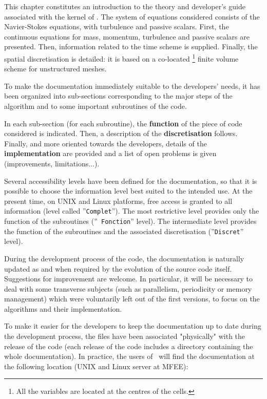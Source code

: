 This chapter constitutes an introduction to the theory and developer's guide
associated with the kernel of \CS.
The system of equations considered consists of the
Navier-Stokes equations, with turbulence and passive scalars. First, the
continuous equations for mass, momentum, turbulence and passive scalars are
presented. Then, information related to the time scheme is supplied.
Finally, the spatial discretisation is detailed: it is based on a co-located%
\footnote{%
All the variables are located at the centres of the cells.} finite volume
scheme for unstructured meshes.

To make the documentation immediately suitable to the developers' needs, it
has been organized into sub-sections corresponding to the major steps of the
algorithm and to some important subroutines of the code.

In each sub-section (for each subroutine), the \textbf{function} of the
piece of code considered is indicated. Then, a description of the \textbf{%
discretisation} follows. Finally, and more oriented towards the developers,
details of the \textbf{implementation} are provided and a list of open
problems is given (improvements, limitations...).

Several accessibility levels have been defined for the documentation, so
that it is possible to choose the information level best suited to the
intended use. At the present time, on UNIX and Linux platforms, free access
is granted to all information (level called ''\texttt{Complet}''). The most
restrictive level provides only the function of the subroutines (''\texttt{%
Fonction}'' level). The intermediate level provides the function of the
subroutines and the associated discretisation (''\texttt{Discret}'' level).

During the development process of the code, the documentation is naturally
updated as and when required by the evolution of the source code itself.
Suggestions for improvement are welcome. In particular, it will be necessary
to deal with some transverse subjects (such as parallelism, periodicity or
memory management) which were voluntarily left out of the first versions, to
focus on the algorithms and their implementation.

To make it easier for the developers to keep the documentation up to date
during the development process, the files have been associated "physically"
with the release of the code (each release of the code includes a directory
containing the whole documentation). In practice,
the users of \CS\ will find the documentation at the following location
(UNIX and Linux server at MFEE): %

